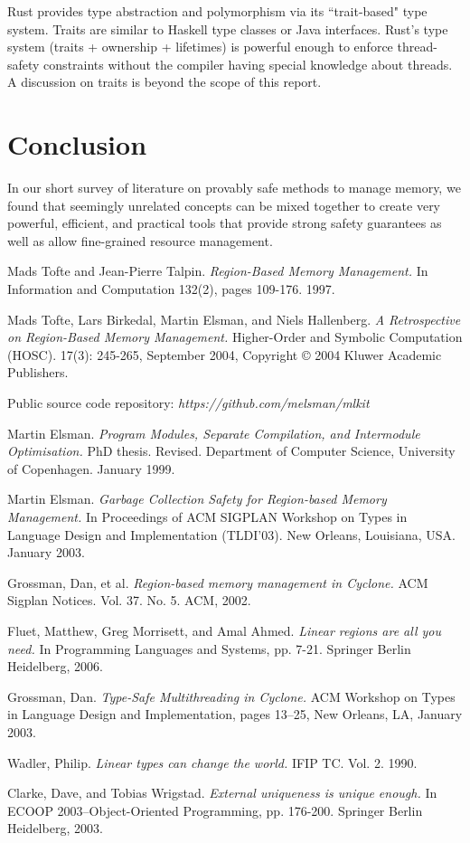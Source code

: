 \documentclass[11pt]{report}
\begin{document}
Rust provides type abstraction and polymorphism via its ``trait-based" type system. Traits are similar to Haskell type classes or Java interfaces. Rust's type system (traits + ownership + lifetimes) is powerful enough to enforce thread-safety constraints without the compiler having special knowledge about threads. A discussion on traits is beyond the scope of this report.

\chapter*{Conclusion}

In our short survey of literature on provably safe methods to manage memory, we found that seemingly unrelated concepts can be mixed together to create very powerful, efficient, and practical tools that provide strong safety guarantees as well as allow fine-grained resource management.

\begin{thebibliography}{10}
Mads Tofte and Jean-Pierre Talpin. \textit{Region-Based Memory Management.} In Information and Computation 132(2), pages 109-176. 1997.

Mads Tofte, Lars Birkedal, Martin Elsman, and Niels Hallenberg. \textit{A Retrospective on Region-Based Memory Management.} Higher-Order and Symbolic Computation (HOSC). 17(3): 245-265, September 2004, Copyright © 2004 Kluwer Academic Publishers.

Public source code repository: \textit{https://github.com/melsman/mlkit}

Martin Elsman. \textit{Program Modules, Separate Compilation, and Intermodule Optimisation.} PhD thesis. Revised. Department of Computer Science, University of Copenhagen. January 1999.
 
Martin Elsman. \textit{Garbage Collection Safety for Region-based Memory Management.} In Proceedings of ACM SIGPLAN Workshop on Types in Language Design and Implementation (TLDI’03). New Orleans, Louisiana, USA. January 2003.

Grossman, Dan, et al. \textit{Region-based memory management in Cyclone.} ACM Sigplan Notices. Vol. 37. No. 5. ACM, 2002.

Fluet, Matthew, Greg Morrisett, and Amal Ahmed. \textit{Linear regions are all you need.} In Programming Languages and Systems, pp. 7-21. Springer Berlin Heidelberg, 2006.

Grossman, Dan. \textit{Type-Safe Multithreading in Cyclone.} ACM Workshop on Types in Language Design and Implementation, pages 13–25, New Orleans, LA, January 2003.

Wadler, Philip. \textit{Linear types can change the world.} IFIP TC. Vol. 2. 1990.

Clarke, Dave, and Tobias Wrigstad. \textit{External uniqueness is unique enough.} In ECOOP 2003–Object-Oriented Programming, pp. 176-200. Springer Berlin Heidelberg, 2003.

\end{thebibliography}
\end{document}
